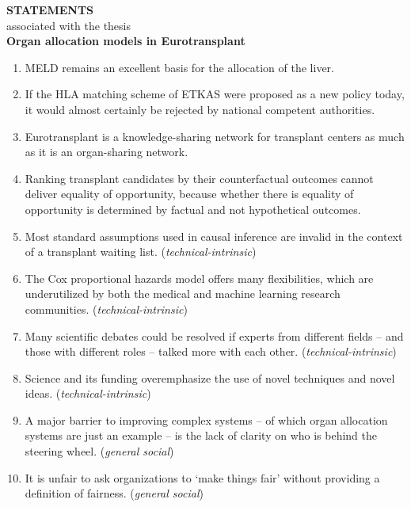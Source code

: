 \documentclass[12pt]{article}
\begin{document}
	
	\begin{center}
		{\Large \textbf{STATEMENTS}}\\[1em]
		\setmainfont{PT Serif}
		{\large associated with the thesis}\\[1em]
		{\large \textbf{Organ allocation models in Eurotransplant}}\\[0.5em]
	\end{center}
	
	\vspace{1em}
		
	\begin{enumerate}[leftmargin=1cm, label=\textbf{\arabic*.}]
		\item MELD remains an excellent basis for the allocation of the liver.
		\item If the HLA matching scheme of ETKAS were proposed as a new policy today, it would almost certainly be rejected by national competent authorities.
		\item Eurotransplant is a knowledge-sharing network for transplant centers as much as it is an organ-sharing network.
		\item Ranking transplant candidates by their counterfactual outcomes cannot deliver equality of opportunity, because whether there is equality of opportunity is determined by factual and not hypothetical outcomes.
		\item Most standard assumptions used in causal inference are invalid in the context of a transplant waiting list. (\textit{technical-intrinsic})
		\item The Cox proportional hazards model offers many flexibilities, which are underutilized by both the medical and machine learning research communities.  (\textit{technical-intrinsic})
		\item Many scientific debates could be resolved if experts from different fields -- and those with different roles -- talked more with each other. (\textit{technical-intrinsic})
		\item Science and its funding overemphasize the use of novel techniques and novel ideas. (\textit{technical-intrinsic})
		\item A major barrier to improving complex systems -- of which organ allocation systems are just an example -- is the lack of clarity on who is behind the steering wheel.  (\textit{general social})
		\item It is unfair to ask organizations to `make things fair' without providing a definition of fairness.  (\textit{general social})


	\end{enumerate}
	
\end{document}
